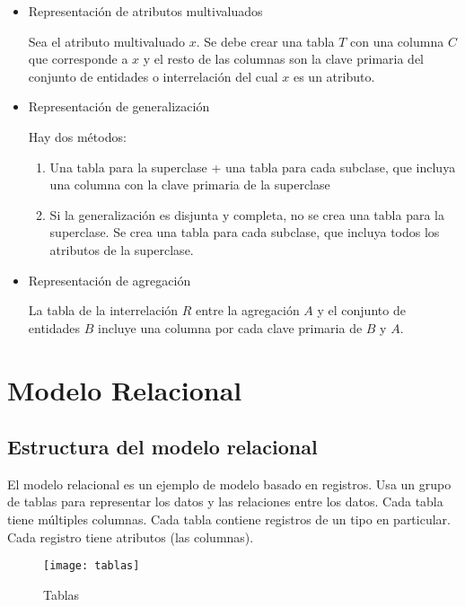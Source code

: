 \documentclass[a4paper, twoside]{article}
\begin{document}
\begin{itemize}
\item Representación de atributos multivaluados


Sea el atributo multivaluado $x$. Se debe crear una tabla $T$ con
una columna $C$ que corresponde a $x$ y el resto de las columnas
son la clave primaria del conjunto de entidades o interrelación del
cual $x$ es un atributo.

\item Representación de generalización


Hay dos métodos:
\begin{enumerate}
\item Una tabla para la superclase + una tabla para cada subclase, que incluya
una columna con la clave primaria de la superclase
\item Si la generalización es disjunta y completa, no se crea una tabla
para la superclase. Se crea una tabla para cada subclase, que incluya
todos los atributos de la superclase.
\end{enumerate}
\item Representación de agregación


La tabla de la interrelación $R$ entre la agregación $A$ y el conjunto
de entidades $B$ incluye una columna por cada clave primaria de $B$
y $A$.

\end{itemize}

\section{\label{sec:Modelo-relacional}Modelo Relacional}


\subsection{Estructura del modelo relacional}

El modelo relacional es un ejemplo de modelo basado en registros.
Usa un grupo de tablas para representar los datos y las relaciones
entre los datos. Cada tabla tiene múltiples columnas. Cada tabla contiene
registros de un tipo en particular. Cada registro tiene atributos
(las columnas).

\begin{figure}[H]
\noindent \begin{centering}
\texttt{[image: tablas]}
\par\end{centering}

\protect\caption{Tablas}
\end{figure}
\end{document}
